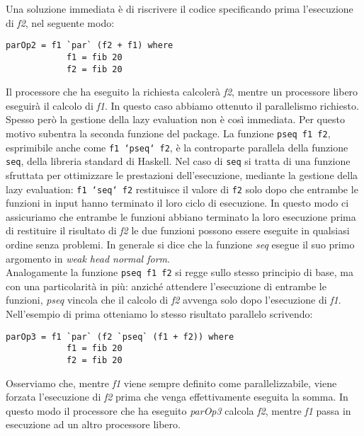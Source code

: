 Una soluzione immediata è di riscrivere il codice specificando prima l'esecuzione di \textit{f2}, nel seguente modo:
\begin{verbatim}
parOp2 = f1 `par` (f2 + f1) where
            f1 = fib 20
            f2 = fib 20
\end{verbatim}
Il processore che ha eseguito la richiesta calcolerà \textit{f2}, mentre un processore libero eseguirà il calcolo di \textit{f1}. In questo caso abbiamo ottenuto il parallelismo richiesto.\\
Spesso però la gestione della lazy evaluation non è così immediata. Per questo motivo subentra la seconda funzione del package. La funzione \texttt{pseq f1 f2}, esprimibile anche come \texttt{f1 `pseq` f2}, è la controparte parallela della funzione \texttt{seq}, della libreria standard di Haskell. Nel caso di \texttt{seq} si tratta di una funzione sfruttata per ottimizzare le prestazioni dell'esecuzione, mediante la gestione della lazy evaluation: \texttt{f1 `seq` f2} restituisce il valore di \texttt{f2} solo dopo che entrambe le funzioni in input hanno terminato il loro ciclo di esecuzione. In questo modo ci assicuriamo che entrambe le funzioni abbiano terminato la loro esecuzione prima di restituire il risultato di \textit{f2} le due funzioni possono essere eseguite in qualsiasi ordine senza problemi. In generale si dice che la funzione \textit{seq} esegue il suo primo argomento in \textit{weak head normal form}.\\
Analogamente la funzione \texttt{pseq f1 f2} si regge sullo stesso principio di base, ma con una particolarità in più: anziché attendere l'esecuzione di entrambe le funzioni, \textit{pseq} vincola che il calcolo di \textit{f2} avvenga solo dopo l'esecuzione di \textit{f1}.\\
Nell'esempio di prima otteniamo lo stesso risultato parallelo scrivendo:
\begin{verbatim}
parOp3 = f1 `par` (f2 `pseq` (f1 + f2)) where
            f1 = fib 20
            f2 = fib 20
\end{verbatim}
Osserviamo che, mentre \textit{f1} viene sempre definito come parallelizzabile, viene forzata l'esecuzione di \textit{f2} prima che venga effettivamente eseguita la somma. In questo modo il processore che ha eseguito \textit{parOp3} calcola \textit{f2}, mentre \textit{f1} passa in esecuzione ad un altro processore libero.

